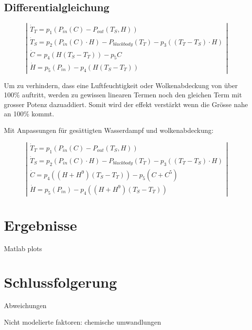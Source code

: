 \begin{refsection}
\subsection{Differentialgleichung}

\begin{equation}
\left|
\begin{array}{lcl}
\dot{T}_T = p_1 \left( P_{in}(C) - P_{out}(T_S, H) \right) \\
\dot{T}_S = p_2 \left( P_{in}(C) \cdot H \right) - P_{blackbody}(T_T) - p_3 \left( (T_T - T_S) \cdot H \right) \\
\dot{C} = p_4 \left( H(T_S - T_T) \right) - p_5 C \\
\dot{H} = p_5 \left(P_{in} \right) - p_4 \left( H(T_S - T_T) \right)
\end{array}
\right|
\end{equation}

Um zu verhindern, dass eine Luftfeuchtigkeit oder Wolkenabdeckung von über 100\% auftritt, werden zu gewissen linearen Termen noch den gleichen Term mit grosser Potenz dazuaddiert. Somit wird der effekt verstärkt wenn die Grösse nahe an 100\% kommt.  

Mit Anpassungen für gesättigten Wasserdampf und wolkenabdeckung:

\begin{equation}
\left|
\begin{array}{lcl}
\dot{T}_T = p_1 \left( P_{in}(C) - P_{out}(T_S, H) \right) \\
\dot{T}_S = p_2 \left( P_{in}(C) \cdot H \right) - P_{blackbody}(T_T) - p_3 \left( (T_T - T_S) \cdot H \right) \\
\dot{C} = p_4 \left( (H + H^9)(T_S - T_T) \right) - p_5 (C + C^5) \\
\dot{H} = p_5 \left(P_{in} \right) - p_4 \left( (H + H^9 )(T_S - T_T) \right)
\end{array}
\right|
\end{equation}

\section{Ergebnisse}

Matlab plots



\section{Schlussfolgerung}

Abweichungen

Nicht modelierte faktoren:
chemische umwandlungen

\printbibliography[heading=subbibliography]
\end{refsection}
